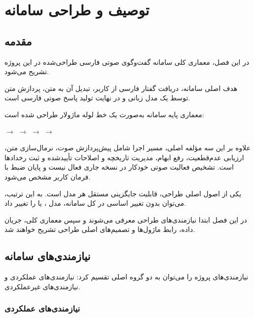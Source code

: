 
\chapter{توصیف و طراحی سامانه}

\section{مقدمه}

در این فصل، معماری کلی سامانه گفت‌وگوی صوتی فارسی طراحی‌شده
در این پروژه تشریح می‌شود.

هدف اصلی سامانه، دریافت گفتار فارسی از کاربر، تبدیل آن به متن،
پردازش متن توسط یک مدل زبانی و در نهایت تولید پاسخ صوتی فارسی
است.

معماری پایه سامانه به‌صورت یک خط لوله ماژولار طراحی شده است:

\begin{center}
$\longrightarrow$
$\longrightarrow$
$\longrightarrow$
$\longrightarrow$
\end{center}

علاوه بر این سه مؤلفه اصلی، مسیر اجرا شامل پیش‌پردازش صوت،
نرمال‌سازی متن، ارزیابی عدم‌قطعیت، رفع ابهام، مدیریت تاریخچه و
اصلاحات تأییدشده و ثبت رخدادها است. تشخیص فعالیت صوتی خودکار
در نسخه جاری فعال نیست و پایان ضبط با فرمان کاربر مشخص می‌شود.

یکی از اصول اصلی طراحی، قابلیت جایگزینی مستقل هر مدل است.
به این ترتیب، می‌توان بدون تغییر اساسی در کل سامانه، مدل ،
 یا  را تغییر داد.

در این فصل ابتدا نیازمندی‌های طراحی معرفی می‌شوند و سپس معماری
کلی، جریان داده، رابط ماژول‌ها و تصمیم‌های اصلی طراحی تشریح
خواهند شد.


\section{نیازمندی‌های سامانه}

نیازمندی‌های پروژه را می‌توان به دو گروه اصلی تقسیم کرد:
نیازمندی‌های عملکردی و نیازمندی‌های غیرعملکردی.


\subsection{نیازمندی‌های عملکردی}

